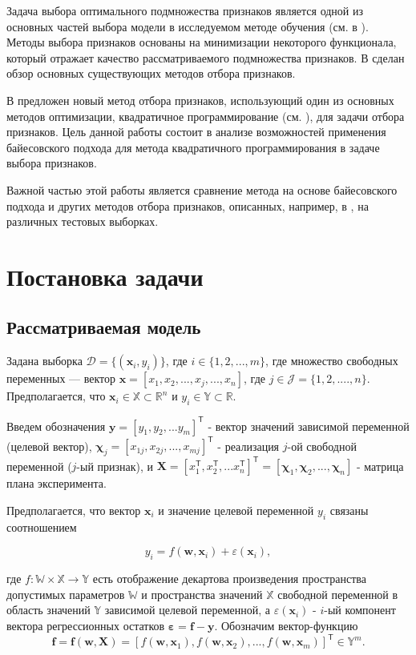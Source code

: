 \documentclass[12pt, twoside]{article}
\newcommand{\bx}{\mathbf{x}}
\newcommand{\by}{\mathbf{y}}
\newcommand{\bw}{\mathbf{w}}
\newcommand{\bfx}{\mathbf{f}}
\newcommand{\bX}{\mathbf{X}}
\newcommand{\bJ}{\mathcal{J}}
\newcommand{\bchi}{\mathbf{\chi}}
\newcommand{\beps}{\boldsymbol{\varepsilon}}
\newcommand{\getT}{^{\mathsf{T}}}
\begin{document}
Задача выбора оптимального подмножества признаков является одной из основных частей выбора модели в исследуемом методе обучения (см. в \cite{Bolon-Canedo}).
Методы выбора признаков основаны на минимизации некоторого функционала, который отражает качество
рассматриваемого подмножества признаков. В \cite{FeatureSelection1, FeatureSelection2} сделан обзор основных существующих методов отбора признаков.

В \cite{KatrutsaS17} предложен новый метод отбора признаков, использующий один из основных методов оптимизации, квадратичное программирование (см. \cite{Rodriguez}), для задачи отбора признаков. Цель данной работы состоит в анализе возможностей применения байесовского подхода для метода квадратичного программирования в задаче выбора признаков. 

Важной частью этой работы является сравнение метода на основе байесовского подхода и других методов отбора признаков, описанных, например, в \cite{Katrutsa15}, на различных тестовых выборках.


\section{Постановка задачи}

\subsection{Рассматриваемая модель}
Задана выборка $\mathcal{D} = \{(\bx_i, y_i)\}$, где $i \in \{1, 2, ..., m\}$, где множество свободных переменных --- вектор $\bx = [x_1, x_2, ...,x_j, ..., x_n]$, где $j \in \bJ = \{1, 2, ...., n\}$. Предполагается, что $\bx_i \in \mathbb{X} \subset \mathbb{R}^n$ и $y_i \in \mathbb{Y} \subset \mathbb{R}$.

Введем обозначения $\by = [y_1, y_2, ... y_m]\getT$ - вектор значений зависимой переменной (целевой вектор), $\bchi_j = [x_{1j}, x_{2j}, ..., x_{mj}]\getT$ - реализация $j$-ой свободной переменной ($j$-ый признак), и $\bX = [x_1\getT, x_2\getT, ...x_n\getT]\getT = [\bchi_1, \bchi_2, ..., \bchi_n]$ - матрица плана эксперимента. 

Предполагается, что вектор $\bx_i$ и значение целевой переменной $y_i$ связаны соотношением 

$$y_i = f(\bw, \bx_i) + \varepsilon(\bx_i),$$

где $f: \mathbb{W} \times \mathbb{X} \rightarrow \mathbb{Y}$  есть отображение декартова произведения пространства допустимых параметров $\mathbb{W}$ и пространства значений $\mathbb{X}$ свободной переменной в область значений $\mathbb{Y}$ зависимой целевой переменной, а $\varepsilon(\bx_i)$ - $i$-ый компонент вектора регрессионных остатков $\beps = \bfx - \by.$ Обозначим вектор-функцию $$\bfx = \bfx(\bw, \bX) = [f(\bw, \bx_1), f(\bw, \bx_2), ..., f(\bw, \bx_m)]\getT \in \mathbb{Y}^m.$$
\end{document}
